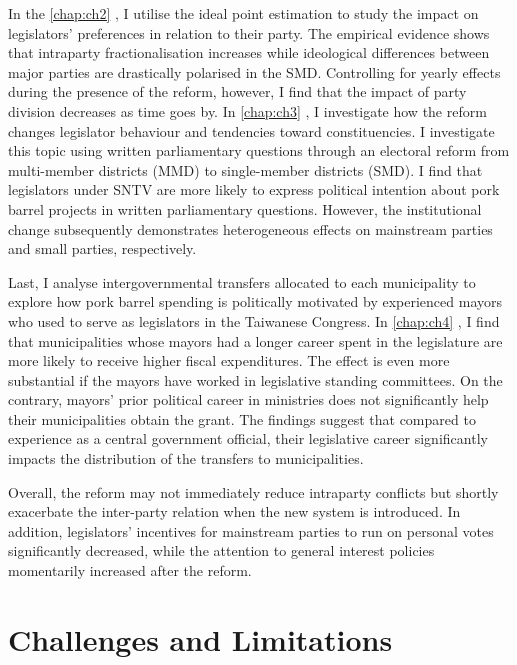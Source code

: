 In the \autoref{chap:ch2} , I utilise the ideal point estimation to study the impact on legislators' preferences in relation to their party. The empirical evidence shows that intraparty fractionalisation increases while ideological differences between major parties are drastically polarised in the SMD. Controlling for yearly effects during the presence of the reform, however, I find that the impact of party division decreases as time goes by. In \autoref{chap:ch3} , I investigate how the reform changes legislator behaviour and tendencies toward constituencies. I investigate this topic using written parliamentary questions through an electoral reform from multi-member districts (MMD) to single-member districts (SMD). I find that legislators under SNTV are more likely to express political intention about pork barrel projects in written parliamentary questions. However, the institutional change subsequently demonstrates heterogeneous effects on mainstream parties and small parties, respectively.  

Last, I analyse intergovernmental transfers allocated to each municipality to explore how pork barrel spending is politically motivated by experienced mayors who used to serve as legislators in the Taiwanese Congress. In \autoref{chap:ch4} , I find that municipalities whose mayors had a longer career spent in the legislature are more likely to receive higher fiscal expenditures. The effect is even more substantial if the mayors have worked in legislative standing committees. On the contrary, mayors' prior political career in ministries does not significantly help their municipalities obtain the grant. The findings suggest that compared to experience as a central government official, their legislative career significantly impacts the distribution of the transfers to municipalities.

Overall, the reform may not immediately reduce intraparty conflicts but shortly exacerbate the inter-party relation when the new system is introduced. In addition, legislators' incentives for mainstream parties to run on personal votes significantly decreased, while the attention to general interest policies momentarily increased after the reform.

\section*{\centering Challenges and Limitations}

